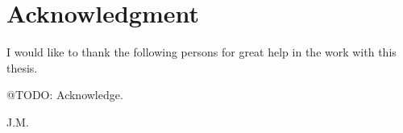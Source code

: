 \section*{Acknowledgment}
I would like to thank the following persons for great help in the work with this thesis.

@TODO: Acknowledge.

\begin{flushright}
J.M.
\end{flushright}